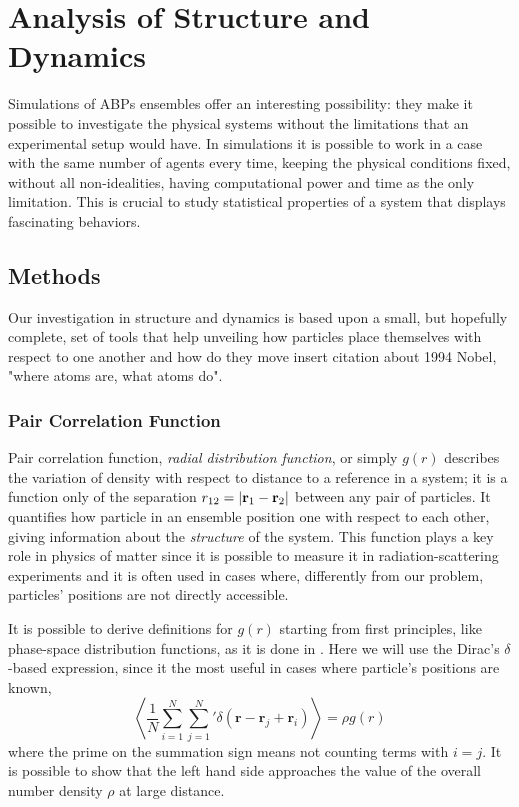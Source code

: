 \documentclass[../../master_thesis_np.tex]{subfiles}
\begin{document}
	\chapter{Analysis of Structure and Dynamics}
	Simulations of ABPs ensembles offer an interesting possibility: they make it possible to investigate the physical systems without the limitations that an experimental setup would have. 
	In simulations it is possible to work in a case with the same number of agents every time, keeping the physical conditions fixed, without all non-idealities, having computational power and time as the only limitation. 
	This is crucial to study statistical properties of a system that displays fascinating behaviors.
	
	\section{Methods}
	Our investigation in structure and dynamics is based upon a small, but hopefully complete, set of tools that help unveiling how particles place themselves with respect to one another and how do they move {\color{blue} insert citation about 1994 Nobel, "where atoms are, what atoms do"}.
	
		\subsection{Pair Correlation Function}
		Pair correlation function, \emph{radial distribution function}, or simply $g(r)$ describes the variation of density with respect to distance to a reference in a system; it is a function only of the separation $r_{12} = \abs{\vb{r}_1 - \vb{r}_2}$ between any pair of particles. 
		It quantifies how particle in an ensemble position one with respect to each other, giving information about the \emph{structure} of the system. 
		This function plays a key role in physics of matter since it is possible to measure it in radiation-scattering experiments and it is often used in cases where, differently from our problem, particles' positions are not directly accessible.
		
		It is possible to derive definitions for $g(r)$ starting from first principles, like phase-space distribution functions, as it is done in \cite{hansen90a}. 
		Here we will use the Dirac's $\delta$-based expression, since it the most useful in cases where particle's positions are known,
		\begin{equation}
			\left\langle \frac{1}{N} \sum_{i=1}^{N} \sum_{j=1}^{N}{}' \delta (\mathbf{r} - \mathbf{r}_j + \mathbf{r}_i) \right\rangle = \rho g(r)
		\end{equation}
		where the prime on the summation sign means not counting terms with $i = j$. 
		It is possible to show that the left hand side approaches the value of the overall number density $\rho$ at large distance.
		
\end{document}
